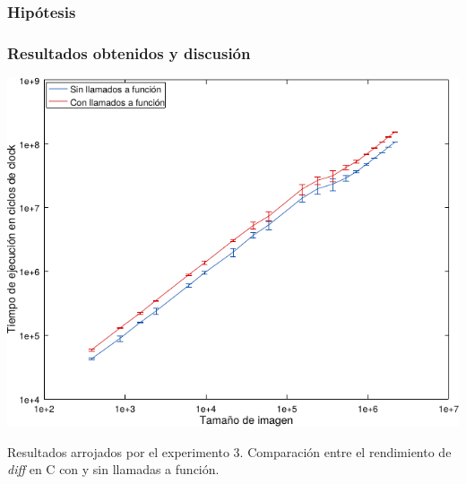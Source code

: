        \subsubsection*{Hipótesis}

        \subsubsection*{Resultados obtenidos y discusión}

            \noindent{} \begin{minipage}{\textwidth}
                \begin{center}
                    \vspace{1em}
                    \includegraphics{graficos/exp3-diff-c_vs_c2.pdf}
                    \vspace{1em}

                    Resultados arrojados por el experimento 3. Comparación entre el rendimiento de \emph{diff} en C con y sin llamadas a función.
                \end{center}
            \end{minipage}

